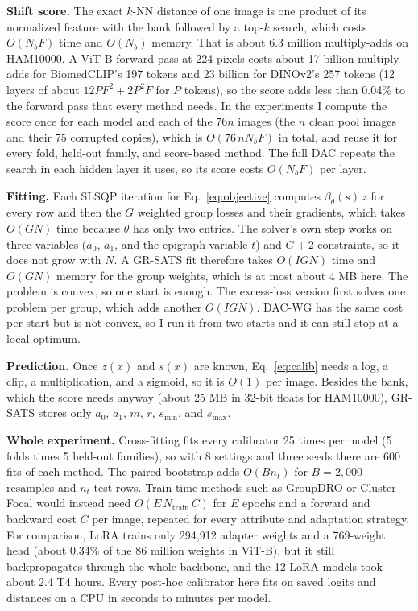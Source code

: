 \documentclass[sigconf,nonacm]{acmart}
\begin{document}
\textbf{Shift score.} The exact $k$-NN distance of one image is one product of its normalized feature with the bank followed by a top-$k$ search, which costs $O(N_b F)$ time and $O(N_b)$ memory. That is about 6.3 million multiply-adds on HAM10000. A ViT-B forward pass at 224 pixels costs about 17 billion multiply-adds for BiomedCLIP's 197 tokens and 23 billion for DINOv2's 257 tokens (12 layers of about $12PF^2 + 2P^2F$ for $P$ tokens), so the score adds less than 0.04\% to the forward pass that every method needs. In the experiments I compute the score once for each model and each of the $76n$ images (the $n$ clean pool images and their 75 corrupted copies), which is $O(76\, n N_b F)$ in total, and reuse it for every fold, held-out family, and score-based method. The full DAC repeats the search in each hidden layer it uses, so its score costs $O(N_b F)$ per layer.

\textbf{Fitting.} Each SLSQP iteration for Eq.~\eqref{eq:objective} computes $\beta_\theta(s)\, z$ for every row and then the $G$ weighted group losses and their gradients, which takes $O(GN)$ time because $\theta$ has only two entries. The solver's own step works on three variables ($a_0$, $a_1$, and the epigraph variable $t$) and $G + 2$ constraints, so it does not grow with $N$. A GR-SATS fit therefore takes $O(IGN)$ time and $O(GN)$ memory for the group weights, which is at most about 4 MB here. The problem is convex, so one start is enough. The excess-loss version first solves one problem per group, which adds another $O(IGN)$. DAC-WG has the same cost per start but is not convex, so I run it from two starts and it can still stop at a local optimum.

\textbf{Prediction.} Once $z(x)$ and $s(x)$ are known, Eq.~\eqref{eq:calib} needs a log, a clip, a multiplication, and a sigmoid, so it is $O(1)$ per image. Besides the bank, which the score needs anyway (about 25 MB in 32-bit floats for HAM10000), GR-SATS stores only $a_0$, $a_1$, $m$, $r$, $s_{\min}$, and $s_{\max}$.

\textbf{Whole experiment.} Cross-fitting fits every calibrator 25 times per model (5 folds times 5 held-out families), so with 8 settings and three seeds there are 600 fits of each method. The paired bootstrap adds $O(B n_t)$ for $B = 2{,}000$ resamples and $n_t$ test rows. Train-time methods such as GroupDRO or Cluster-Focal would instead need $O(E\, N_{\text{train}}\, C)$ for $E$ epochs and a forward and backward cost $C$ per image, repeated for every attribute and adaptation strategy. For comparison, LoRA trains only 294,912 adapter weights and a 769-weight head (about 0.34\% of the 86 million weights in ViT-B), but it still backpropagates through the whole backbone, and the 12 LoRA models took about 2.4 T4 hours. Every post-hoc calibrator here fits on saved logits and distances on a CPU in seconds to minutes per model.
\end{document}
